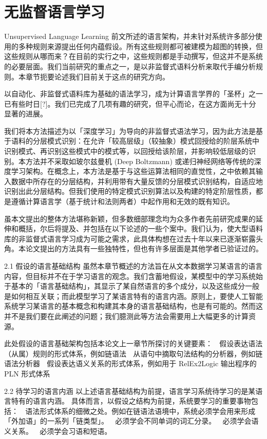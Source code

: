 \chapter{无监督语言学习}{Unsupervised Language Learning}
前文所述的语言架构，并未针对系统许多部分使用的多种规则来源提出任何内蕴假设。所有这些规则都可被建模为超图的转换，但这些规则从哪而来？在目前的实行之中，这些规则都是手动撰写，但这并不是系统的必要层面。我们当前研究的重点之一，是以非监督式语料分析来取代手编分析规则。本章节扼要论述我们目前关于这点的研究方向。 

以自动化、非监督式语料库为基础的语法学习，成为计算语言学界的「圣杯」之一已有些时日[?]。我们已完成了几项有趣的研究，但平心而论，在这方面尚无十分显著的进展。

我们将本方法描述为以「深度学习」为导向的非监督式语法学习，因为此方法是基于语料的分层模式识别：在允许「较高层级」（较抽象）模式回授给的阶层系统中识别模式、再识别这些模式中的模式等，以回授给该阶层，并影响较低层级的识别。本方法并不采取如玻尔兹曼机 (Deep Boltzmann) 或递归神经网络等传统的深度学习架构。在概念上，本方法是基于与这些运算法相同的直觉性，之中依赖其输入数据中所存在的分层结构，并利用带有大量反馈的分层模式识别结构，自适应地识别出此分层结构。但我们使用的特定模式识别算法以及构建的特定阶层性质，都是遵循计算语言学（基于统计和法则两者）中起作用和无效的既有知识。 

虽本文提出的整体方法堪称新颖，但多数细部理念均为众多作者先前研究成果的延伸和概括，尔后将提及、并包括在以下论述的一些个案中。我们认为，使大型语料库的非监督式语言学习成为可能之需求，此具体构想在过去十年以来已逐渐崭露头角。本论文提出的方法具有一些独特性，但也有许多层面是其他学者已验证过的。

2.1 假设的语言基础结构
虽然本章节概述的方法旨在从文本数据学习某语言的语言内容，但目标并不在于学习语言的观念。我们含蓄地假设，某模型中的学习系统始于基本的「语言基础结构」，其显示了某自然语言的多个成分，以及这些成分一般是如何相互关联；而此模型学习了某语言特有的语言内涵。原则上，要使人工智能系统学习某语言的基本概念和构建其本身的语言基础结构，也是有可能的。然而这并不是我们要在此阐述的问题；我们臆测此等方法会需要用上大幅更多的计算资源。 

此处假设的语言基础架构包括本论文上一章节所探讨的关键要素：
	假设表达语法（从属）规则的形式体系，例如链语法 
	从语句中摘取句法结构的分析器，例如链语法分析器
	假设表达语义关系的形式体系，例如用于 RelEx2Logic 输出程序的 PLN 形式体系

2.2 待学习的语言内涵
以上述语言基础结构为前提，语言学习系统待学习的是某语言特有的语言内涵。 
具体而言，以假设之结构为前提，系统要学习的重要事物包括：
	语法形式体系的细微之处。例如在链语法语境中，系统必须学会用来形成「外加语」的一系列「链类型」。 
	必须学会不同单词的词汇分录。 
	必须学会语义关系。 
	必须学会习语和短语。

